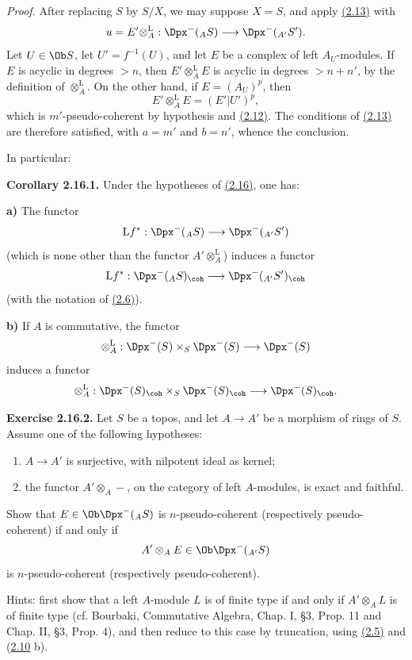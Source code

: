 \emph{Proof.} After replacing \(S\) by \(S/X\), we may suppose \(X=S\), and apply \hyperlink{sga6.e01.prop.2-13}{(2.13)} with
\[
  u=E'\otimes_A^{\mathrm L}:\Dpx^-(_A S)\longrightarrow \Dpx^-(_{A'}S').
\]
Let \(U\in\Ob S\), let \(U'=f^{-1}(U)\), and let \(E\) be a complex of left \(A_U\)-modules. If \(E\) is acyclic in degrees \(>n\), then \(E'\otimes_A^{\mathrm L}E\) is acyclic in degrees \(>n+n'\), by the definition of \(\otimes_A^{\mathrm L}\). On the other hand, if \(E=(A_U)^p\), then
\[
  E'\otimes_A^{\mathrm L}E=(E'|U')^p,
\]
which is \(m'\)-pseudo-coherent by hypothesis and \hyperlink{sga6.e01.prop.2-12}{(2.12)}. The conditions of \hyperlink{sga6.e01.prop.2-13}{(2.13)} are therefore satisfied, with \(a=m'\) and \(b=n'\), whence the conclusion.

In particular:

\textbf{Corollary 2.16.1.} Under the hypotheses of \hyperlink{sga6.e01.cor.2-16}{(2.16)}, one has:

\textbf{a)} The functor
\[
  \mathrm L f^*: \Dpx^-(_A S)\longrightarrow \Dpx^-(_{A'}S')
\]
(which is none other than the functor \(A'\otimes_A^{\mathrm L}\)) induces a functor
\[
  \mathrm L f^*: \Dpx^-(_A S)_{\coh}\longrightarrow \Dpx^-(_{A'}S')_{\coh}
\]
(with the notation of \hyperlink{sga6.e01.schol.2-6}{(2.6)}).

\textbf{b)} If \(A\) is commutative, the functor
\[
  \otimes_A^{\mathrm L}:\Dpx^-(S)\times_S\Dpx^-(S)
  \longrightarrow \Dpx^-(S)
\]
induces a functor
\[
  \otimes_A^{\mathrm L}:\Dpx^-(S)_{\coh}\times_S\Dpx^-(S)_{\coh}
  \longrightarrow \Dpx^-(S)_{\coh} .
\]

\textbf{Exercise 2.16.2.} Let \(S\) be a topos, and let \(A\to A'\) be a morphism of rings of \(S\). Assume one of the following hypotheses:
\begin{enumerate}[label=(\roman*)]
\item \(A\to A'\) is surjective, with nilpotent ideal as kernel;
\item the functor \(A'\otimes_A-\), on the category of left \(A\)-modules, is exact and faithful.
\end{enumerate}
Show that \(E\in\Ob\Dpx^-(_A S)\) is \(n\)-pseudo-coherent (respectively pseudo-coherent) if and only if
\[
  A'\otimes_A E\in\Ob\Dpx^-(_{A'}S)
\]
is \(n\)-pseudo-coherent (respectively pseudo-coherent).

Hints: first show that a left \(A\)-module \(L\) is of finite type if and only if \(A'\otimes_A L\) is of finite type (cf. Bourbaki, Commutative Algebra, Chap. I, §3, Prop. 11 and Chap. II, §3, Prop. 4), and then reduce to this case by truncation, using \hyperlink{sga6.e01.prop.2-5}{(2.5)} and (\hyperlink{sga6.e01.prop.2-10}{2.10} b).


